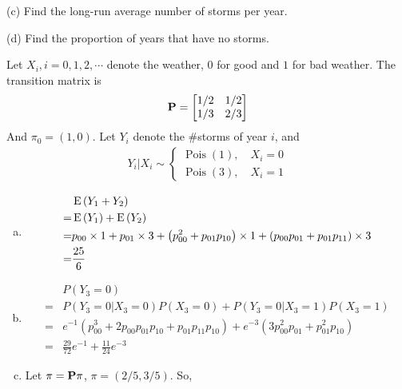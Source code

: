 \documentclass[en,hazy,blue,12pt,device = normal]{elegantnote}
\begin{document}
\begin{enumerate}
    (c) Find the long-run average number of storms per year.

    (d) Find the proportion of years that have no storms.
    
    \begin{tcolorbox}
        \sol

        Let \(X_i, i = 0,1,2,\cdots\) denote the weather, \(0\) for good and \(1\) for bad weather. The transition matrix is
        \begin{align*}{\bf P} = 
            \begin{bmatrix}
                1/2&1/2\\
                1/3&2/3
            \end{bmatrix}
        \end{align*}
        And \(\pi_0 = (1,0)\). Let \(Y_i\) denote the \#storms of year \(i\), and 
        \begin{align*}
            Y_i|X_i \sim \begin{cases}
                \operatorname{Pois}(1),\quad X_i = 0 \\
                \operatorname{Pois}(3),\quad X_i = 1
            \end{cases}
        \end{align*}
        \begin{enumerate}[(a)]
            \item \begin{align*}
                &\operatorname E\left(Y_1+Y_2\right) \\
                =& \operatorname E\left(Y_1\right) + \operatorname E\left(Y_2\right)\\
                =& p_{00} \times 1 + p_{01} \times 3 + \left( p_{00}^2  + p_{01}p_{10} \right) \times 1 + \left( p_{00}p_{01} + p_{01}p_{11} \right) \times 3 \\
                =& \frac{25}{6}
            \end{align*}
            \item \begin{align*}
                &P(Y_3 = 0) \\
                =&P(Y_3 = 0|X_3 = 0) P(X_3 = 0) + P(Y_3 = 0|X_3 = 1) P(X_3 = 1) \\
                =& e^{-1} (p_{00}^3 + 2p_{00}p_{01}p_{10}+ p_{01}p_{11}p_{10})+e^{-3} (3p_{00}^2p_{01}+p_{01}^2p_{10})\\
                =& \frac{29}{72} e^{-1} + \frac{11}{24} e^{-3}
            \end{align*}
            \item Let \(\pi = {\bf P} \pi\), \(\pi = (2/5,3/5)\). So,

\end{enumerate}
\end{tcolorbox}
\end{enumerate}
\end{document}
